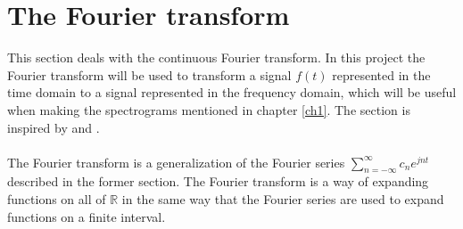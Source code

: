 \section{The Fourier transform}
This section deals with the continuous Fourier transform. In this project the Fourier transform will be used to transform a signal $f(t)$ represented in the time domain to a signal represented in the frequency domain, which will be useful when making the spectrograms mentioned in chapter \ref{ch1}. The section is inspired by \cite{FourierTrans} and \cite{FAA}.
\\ \\
The Fourier transform is a generalization of the Fourier series $\sum_{n=-\infty}^\infty c_n e^{j n t}$ described in the former section. The Fourier transform is a way of expanding functions on all of $\mathbb{R}$ in the same way that the Fourier series are used to expand functions on a finite interval.

%
%
%
%

